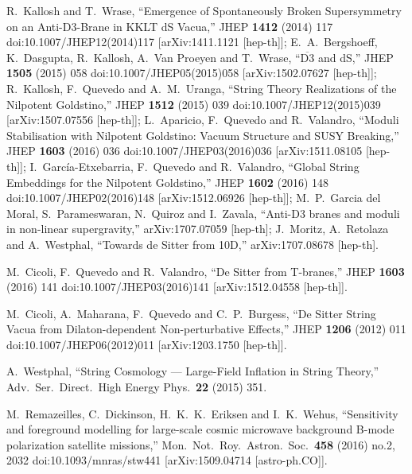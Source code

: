 \documentclass[11pt,a4paper]{article}
\begin{document}
\begin{thebibliography}{99}
  R.~Kallosh and T.~Wrase,
  ``Emergence of Spontaneously Broken Supersymmetry on an Anti-D3-Brane in KKLT dS Vacua,''
  JHEP {\bf 1412} (2014) 117
  doi:10.1007/JHEP12(2014)117
  [arXiv:1411.1121 [hep-th]]; 
   E.~A.~Bergshoeff, K.~Dasgupta, R.~Kallosh, A.~Van Proeyen and T.~Wrase,
  ``$ \overline{\mathrm{D}3} $ and dS,''
  JHEP {\bf 1505} (2015) 058
  doi:10.1007/JHEP05(2015)058
  [arXiv:1502.07627 [hep-th]];
  R.~Kallosh, F.~Quevedo and A.~M.~Uranga,
  ``String Theory Realizations of the Nilpotent Goldstino,''
  JHEP {\bf 1512} (2015) 039
  doi:10.1007/JHEP12(2015)039
  [arXiv:1507.07556 [hep-th]];
  L.~Aparicio, F.~Quevedo and R.~Valandro,
  ``Moduli Stabilisation with Nilpotent Goldstino: Vacuum Structure and SUSY Breaking,''
  JHEP {\bf 1603} (2016) 036
  doi:10.1007/JHEP03(2016)036
  [arXiv:1511.08105 [hep-th]];
   I.~García-Etxebarria, F.~Quevedo and R.~Valandro,
  ``Global String Embeddings for the Nilpotent Goldstino,''
  JHEP {\bf 1602} (2016) 148
  doi:10.1007/JHEP02(2016)148
  [arXiv:1512.06926 [hep-th]];
	M.~P.~Garcia del Moral, S.~Parameswaran, N.~Quiroz and I.~Zavala,
  ``Anti-D3 branes and moduli in non-linear supergravity,''
  arXiv:1707.07059 [hep-th];
 J.~Moritz, A.~Retolaza and A.~Westphal,
  ``Towards de Sitter from 10D,''
  arXiv:1707.08678 [hep-th].

  M.~Cicoli, F.~Quevedo and R.~Valandro,
  ``De Sitter from T-branes,''
  JHEP {\bf 1603} (2016) 141
  doi:10.1007/JHEP03(2016)141
  [arXiv:1512.04558 [hep-th]].

  M.~Cicoli, A.~Maharana, F.~Quevedo and C.~P.~Burgess,
  ``De Sitter String Vacua from Dilaton-dependent Non-perturbative Effects,''
  JHEP {\bf 1206} (2012) 011
  doi:10.1007/JHEP06(2012)011
  [arXiv:1203.1750 [hep-th]].

  A.~Westphal,
  ``String Cosmology — Large-Field Inflation in String Theory,''
  Adv.\ Ser.\ Direct.\ High Energy Phys.\  {\bf 22} (2015) 351.

  M.~Remazeilles, C.~Dickinson, H.~K.~K.~Eriksen and I.~K.~Wehus,
  ``Sensitivity and foreground modelling for large-scale cosmic microwave background B-mode polarization satellite missions,''
  Mon.\ Not.\ Roy.\ Astron.\ Soc.\  {\bf 458} (2016) no.2,  2032
  doi:10.1093/mnras/stw441
  [arXiv:1509.04714 [astro-ph.CO]].


\end{thebibliography}
\end{document}
